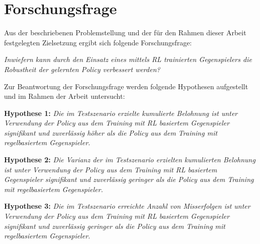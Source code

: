 \section{Forschungsfrage}

Aus der beschriebenen Problemstellung und der für den Rahmen dieser Arbeit festgelegten Zielsetzung ergibt sich folgende Forschungsfrage: 

\textit{Inwiefern kann durch den Einsatz eines mittels RL trainierten Gegenspielers die Robustheit der gelernten Policy verbessert werden?}

Zur Beantwortung der Forschungsfrage werden folgende Hypothesen aufgestellt und im Rahmen der Arbeit untersucht:

\textbf{Hypothese 1:}
\textit{Die im Testszenario erzielte kumulierte Belohnung ist unter Verwendung der Policy aus dem Training mit RL basiertem Gegenspieler signifikant und zuverlässig höher als die Policy aus dem Training mit regelbasiertem Gegenspieler.}

\textbf{Hypothese 2:}
\textit{Die Varianz der im Testszenario erzielten kumulierten Belohnung ist unter Verwendung der Policy aus dem Training mit RL basiertem Gegenspieler signifikant und zuverlässig geringer als die Policy aus dem Training mit regelbasiertem Gegenspieler.}

\textbf{Hypothese 3:}
\textit{Die im Testszenario erreichte Anzahl von Misserfolgen ist unter Verwendung der Policy aus dem Training mit RL basiertem Gegenspieler signifikant und zuverlässig geringer als die Policy aus dem Training mit regelbasiertem Gegenspieler.}

